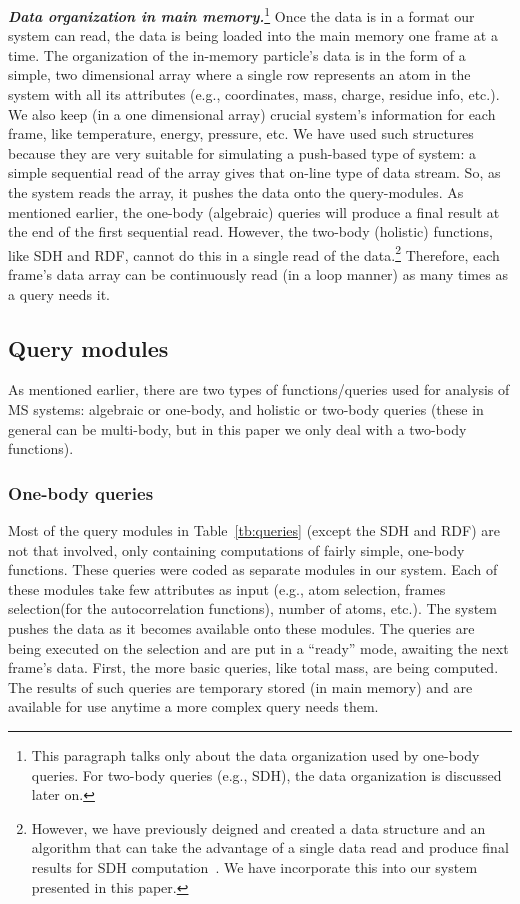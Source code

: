 \documentclass[10pt,journal,final,letterpaper,twocolumn]{IEEEtran}
\begin{document}
\textbf{\emph{Data organization in main memory.}}\footnote{This
paragraph talks only about the data organization used by one-body
queries. For two-body queries (e.g., SDH), the data organization is
discussed later on.} Once the data is in a format our system can
read, the data is being loaded into the main memory one frame at a
time. The organization of the in-memory particle's data is in the
form of a simple, two dimensional array where a single row
represents an atom in the system with all its attributes (e.g.,
coordinates, mass, charge, residue info, etc.). We also keep (in a
one dimensional array) crucial system's information for each frame,
like temperature, energy, pressure, etc. We have used such
structures because they are very suitable for simulating a
push-based type of system: a simple sequential read of the array
gives that on-line type of data stream. So, as the system reads the
array, it pushes the data onto the query-modules. As mentioned
earlier, the one-body (algebraic) queries will produce a final
result at the end of the first sequential read. However, the
two-body (holistic) functions, like SDH and RDF, cannot do this in a
single read of the data.\footnote{However, we have previously
deigned and created a data structure and an algorithm that can take
the advantage of a single data read and produce final results for
SDH computation~\cite{ytu:icde09,EDBT12}. We have incorporate this
into our system presented in this paper.} Therefore, each frame's
data array can be continuously read (in a loop manner) as many times
as a query needs it.
\subsection{Query modules}

As mentioned earlier, there are two types of functions/queries used
for analysis of MS systems: algebraic or one-body, and holistic or
two-body queries (these in general can be multi-body, but in this
paper we only deal with a two-body functions).

\subsubsection{One-body queries} Most of the query modules in
Table~\ref{tb:queries} (except the SDH and RDF) are not that
involved, only containing computations of fairly simple, one-body
functions. These queries were coded as separate modules in our
system. Each of these modules take few attributes as input (e.g.,
atom selection, frames selection(for the autocorrelation functions),
number of atoms, etc.). The system pushes the data as it becomes
available onto these modules. The queries are being executed on the
selection and are put in a ``ready'' mode, awaiting the next frame's
data. First, the more basic queries, like total mass, are being
computed. The results of such queries are temporary stored (in main
memory) and are available for use anytime a more complex query needs
them.
\end{document}
